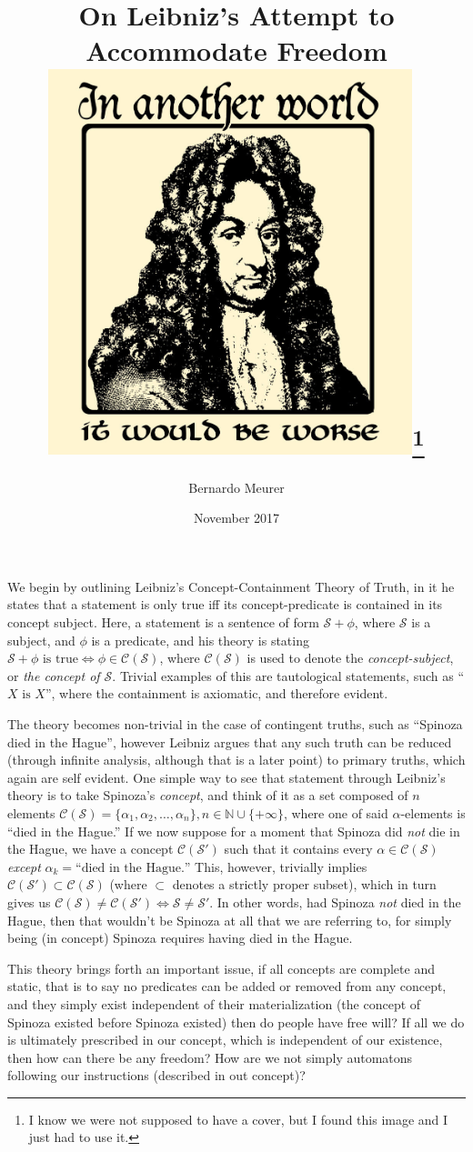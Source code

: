 \documentclass[12pt,letterpaper]{article}
\title{On Leibniz's Attempt to Accommodate Freedom\\
    \vfill
    \includegraphics[width=400px]{leibniz.jpg}\footnote{I know we were not supposed to have a cover, but I found this image and I just had to use it.}
    \vfill
    }
\date{November 2017}
\author{Bernardo Meurer}
\begin{document}
    \maketitle
    \newpage
    We begin by outlining Leibniz’s Concept-Containment Theory of Truth, in it he states that a statement is only true iff its concept-predicate is contained in its concept subject. Here, a statement is a sentence of form \(\mathcal S + \phi \), where \(\mathcal S\) is a subject, and \(\phi \) is a predicate, and his theory is stating \(\mathcal S + \phi\text{ is true} \iff \phi\in\mathcal C(\mathcal S) \), where \(\mathcal C(\mathcal S) \) is used to denote the \emph{concept-subject}, or \emph{the concept of \(\mathcal S \)}. Trivial examples of this are tautological statements, such as ``\(X\text{ is }X \)'', where the containment is axiomatic, and therefore evident.

    The theory becomes non-trivial in the case of contingent truths, such as ``Spinoza died in the Hague'', however Leibniz argues that any such truth can be reduced (through infinite analysis, although that is a later point) to primary truths, which again are self evident. One simple way to see that statement through Leibniz's theory is to take Spinoza's \emph{concept}, and think of it as a set composed of \(n \) elements \(\mathcal C(\mathcal S) = \{\alpha_1, \alpha_2, \ldots, \alpha_n \}, n\in\mathbb N \cup \{+\infty \} \), where one of said \(\alpha \)-elements is ``died in the Hague.'' If we now suppose for a moment that Spinoza did \emph{not} die in the Hague, we have a concept \(\mathcal C (\mathcal S')\) such that it contains every \(\alpha \in \mathcal C (\mathcal S)\) \emph{except} \(\alpha_k = \text{``died in the Hague.''}\) This, however, trivially implies \(\mathcal C(\mathcal S') \subset \mathcal C(\mathcal S) \) (where \(\subset \) denotes a strictly proper subset), which in turn gives us \(\mathcal C(\mathcal S) \neq \mathcal C(\mathcal S') \iff  \mathcal S \neq \mathcal S'\). In other words, had Spinoza \emph{not} died in the Hague, then that wouldn't be Spinoza at all that we are referring to, for simply being (in concept) Spinoza requires having died in the Hague\footnotemark[1].

    This theory brings forth an important issue, if all concepts are complete and static, that is to say no predicates can be added or removed from any concept, and they simply exist independent of their materialization (the concept of Spinoza existed before Spinoza existed) then do people have free will? If all we do is ultimately prescribed in our concept, which is independent of our existence, then how can there be any freedom? How are we not simply automatons following our instructions (described in out concept)?
\end{document}
